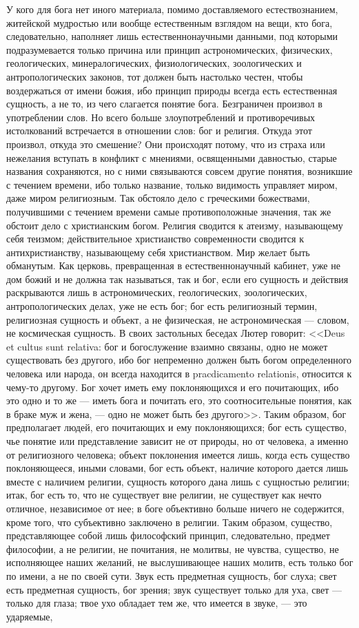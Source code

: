 \documentclass[12pt]{article}
\begin{document}
У кого для бога нет иного материала, помимо доставляемого естествознанием, житейской мудростью или вообще естественным взглядом на вещи, кто бога, следовательно, наполняет лишь естественнонаучными данными, под которыми подразумевается только причина или принцип астрономических, физических, геологических, минералогических, физиологических, зоологических и антропологических законов, тот должен быть настолько честен, чтобы воздержаться от имени божия, ибо принцип природы всегда есть естественная сущность, а не то, из чего слагается понятие бога. Безграничен произвол в употреблении слов. Но всего больше злоупотреблений и противоречивых истолкований встречается в отношении слов: бог и религия. Откуда этот произвол, откуда это смешение? Они происходят потому, что из страха или нежелания вступать в конфликт с мнениями, освященными давностью, старые названия сохраняются, но с ними связываются совсем другие понятия, возникшие с течением времени, ибо только название, только видимость управляет миром, даже миром религиозным. Так обстояло дело с греческими божествами, получившими с течением времени самые противоположные значения, так же обстоит дело с христианским богом. Религия сводится к атеизму, называющему себя теизмом; действительное христианство современности сводится к антихристианству, называющему себя христианством. Мир желает быть обманутым. Как церковь, превращенная в естественнонаучный кабинет, уже не дом божий и не должна так называться, так и бог, если его сущность и действия раскрываются лишь в астрономических, геологических, зоологических, антропологических делах, уже не есть бог; бог есть религиозный термин, религиозная сущность и объект, а не физическая, не астрономическая --- словом, не космическая сущность. В своих застольных беседах Лютер говорит: <<Deus et cultus sunt relativa: бог и богослужение взаимно связаны, одно не может существовать без другого, ибо бог непременно должен быть богом определенного человека или народа, он всегда находится в pracdicamento relationis, относится к чему-то другому. Бог хочет иметь ему поклоняющихся и его почитающих, ибо это одно и то же --- иметь бога и почитать его, это соотносительные понятия, как в браке муж и жена, --- одно не может быть без другого>>. Таким образом, бог предполагает людей, его почитающих и ему поклоняющихся; бог есть существо, чье понятие или представление зависит не от природы, но от человека, а именно от религиозного человека; объект поклонения имеется лишь, когда есть существо поклоняющееся, иными словами, бог есть объект, наличие которого дается лишь вместе с наличием религии, сущность которого дана лишь с сущностью религии; итак, бог есть то, что не существует вне религии, не существует как нечто отличное, независимое от нее; в боге объективно больше ничего не содержится, кроме того, что субъективно заключено в религии. Таким образом, существо, представляющее собой лишь философский принцип, следовательно, предмет философии, а не религии, не почитания, не молитвы, не чувства, существо, не исполняющее наших желаний, не выслушивающее наших молитв, есть только бог по имени, а не по своей сути. Звук есть предметная сущность, бог слуха; свет есть предметная сущность, бог зрения; звук существует только для уха, свет --- только для глаза; твое ухо обладает тем же, что имеется в звуке, --- это ударяемые, 
\end{document}
